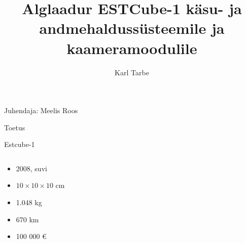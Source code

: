 \documentclass[pdf,draft]{beamer}
\title[Alglaadur ESTCube-1 kahele moodulile]{Alglaadur ESTCube-1 käsu- ja andmehaldussüsteemile ja kaameramoodulile}
\author{Karl Tarbe}
\institute[]{Matemaatika-informaatikateaduskond}
\begin{document}
\begin{frame}[plain]
    \titlepage
    \centerline{\scriptsize Juhendaja: Meelis Roos}
\end{frame}

\begin{frame}{Toetus}
\end{frame}
\begin{frame}{Estcube-1}
    \begin{columns}
        \begin{column}{0.5\textwidth}
            \begin{itemize}
                \item 2008, suvi
                \item \(10 \times 10 \times 10\) cm
                \item 1.048 kg
                \item 670 km
                \item 100 000 \euro
            \end{itemize}
        \end{column}
        \begin{column}{0.5\textwidth}
        \end{column}
    \end{columns}
\end{frame}
\end{document}
